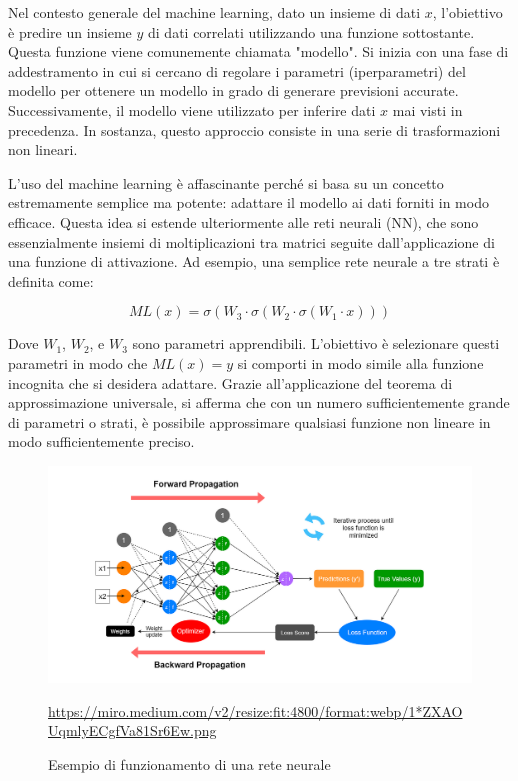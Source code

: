 Nel contesto generale del machine learning, dato un insieme di dati $x$, 
l'obiettivo è predire un insieme $y$ di dati correlati utilizzando una 
funzione sottostante. Questa funzione viene comunemente chiamata "modello". 
Si inizia con una fase di addestramento in cui si cercano di regolare i 
parametri (iperparametri) del modello per ottenere un modello in grado di 
generare previsioni accurate. Successivamente, il modello viene utilizzato 
per inferire dati $x$ mai visti in precedenza. In sostanza, questo 
approccio consiste in una serie di trasformazioni non lineari.

L'uso del machine learning è affascinante perché si basa su un concetto 
estremamente semplice ma potente: adattare il modello ai dati forniti in 
modo efficace. Questa idea si estende ulteriormente alle reti neurali (NN), 
che sono essenzialmente insiemi di moltiplicazioni tra matrici seguite 
dall'applicazione di una funzione di attivazione. Ad esempio, una 
semplice rete neurale a tre strati è definita come:

$$ML(x) = \sigma(W_3 \cdot \sigma(W_2 \cdot \sigma(W_1 \cdot x)))$$

Dove $W_1$, $W_2$, e $W_3$ sono parametri apprendibili. L'obiettivo è 
selezionare questi parametri in modo che $ML(x) = y$ si comporti in modo 
simile alla funzione incognita che si desidera adattare. Grazie 
all'applicazione del teorema di approssimazione universale, si afferma 
che con un numero sufficientemente grande di parametri o strati, è 
possibile approssimare qualsiasi funzione non lineare in modo 
sufficientemente preciso.

\begin{figure}[H]
    \begin{center}
        \includegraphics[width=\textwidth]{img/1_ZXAOUqmlyECgfVa81Sr6Ew.png}
        \caption{Esempio di funzionamento di una rete neurale}
        \url{https://miro.medium.com/v2/resize:fit:4800/format:webp/1*ZXAOUqmlyECgfVa81Sr6Ew.png}
        \label{fig:NN_example}
    \end{center}
\end{figure}

